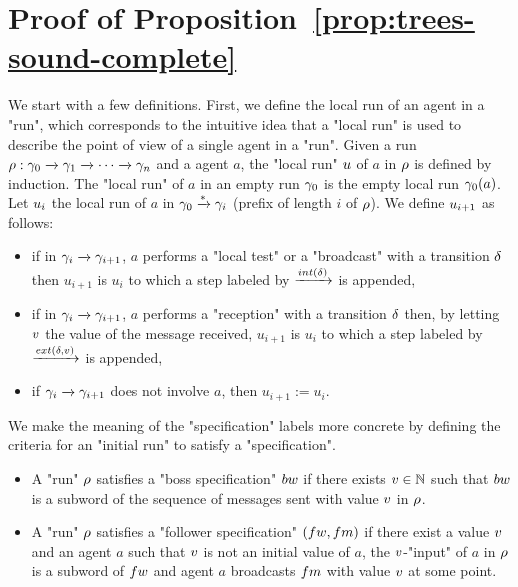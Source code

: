 \section{Proof of Proposition~\ref{prop:trees-sound-complete}}
\label{app:trees-sound-complete}

\treessoundcomplete*
 
We start with a few definitions. 
First, we define the local run of an agent in a "run", which corresponds to the intuitive idea that a "local run" is used to describe the point of view of a single agent in a "run". Given a run $\rho: \gamma_0 \xrightarrow{} \gamma_1 \xrightarrow{} \cdots \xrightarrow{}\gamma_n$ and a agent $a$, the "local run" $u$ of $a$ in $\rho$ is defined by induction. The "local run" of $a$ in an empty run $\gamma_0$ is the empty local run $\gamma_0(a)$. Let $u_i$ the local run of $a$ in $\gamma_0 \xrightarrow{*} \gamma_i$ (prefix of length $i$ of $\rho$). We define $u_{i+1}$ as follows:
\begin{itemize}
\item if in $\gamma_i \xrightarrow{} \gamma_{i+1}$, $a$ performs a "local test" or a "broadcast" with a transition $\delta$ then $u_{i+1}$ is $u_i$ to which a step labeled by $\intstep{\atrans}$ is appended,
\item if in $\gamma_i \xrightarrow{} \gamma_{i+1}$, $a$ performs a "reception" with a transition $\delta$ then, by letting $v$ the value of the message received, $u_{i+1}$ is $u_i$ to which a step labeled by $\step{\extlabel{\atrans}{\aval}}$ is appended,
\item if $\gamma_i \xrightarrow{} \gamma_{i+1}$ does not involve $a$, then $u_{i+1} := u_i$.
\end{itemize}

We make the meaning of the "specification" labels more concrete by defining the criteria for an "initial run" to satisfy a "specification".

\begin{itemize}
	\item A "run" $\rho$ satisfies a "boss specification" $\bossspec$ if there exists $v \in \mathbb{N}$ such that $\bossspec$ is a subword of the sequence of messages sent with value $v$ in $\rho$.
	
	\item A "run" $\rho$ satisfies a "follower specification" $(\followwordspec, \followmessagespec)$ if there exist a value $v$ and an agent $a$ such that $v$ is not an initial value of $a$, the $v$-"input" of $a$ in $\rho$ is a subword of $\followwordspec$ and agent $a$ broadcasts $\followmessagespec$ with value $v$ at some point.
\end{itemize}

